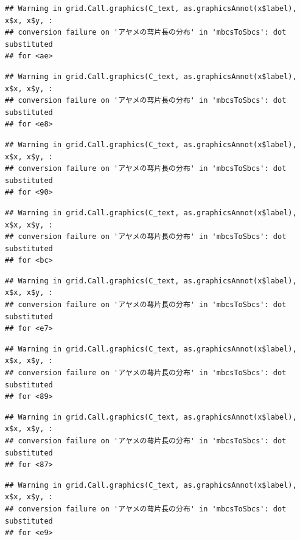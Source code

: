 \documentclass[
]{book}
\begin{document}
\begin{verbatim}
## Warning in grid.Call.graphics(C_text, as.graphicsAnnot(x$label), x$x, x$y, :
## conversion failure on 'アヤメの萼片長の分布' in 'mbcsToSbcs': dot substituted
## for <ae>
\end{verbatim}

\begin{verbatim}
## Warning in grid.Call.graphics(C_text, as.graphicsAnnot(x$label), x$x, x$y, :
## conversion failure on 'アヤメの萼片長の分布' in 'mbcsToSbcs': dot substituted
## for <e8>
\end{verbatim}

\begin{verbatim}
## Warning in grid.Call.graphics(C_text, as.graphicsAnnot(x$label), x$x, x$y, :
## conversion failure on 'アヤメの萼片長の分布' in 'mbcsToSbcs': dot substituted
## for <90>
\end{verbatim}

\begin{verbatim}
## Warning in grid.Call.graphics(C_text, as.graphicsAnnot(x$label), x$x, x$y, :
## conversion failure on 'アヤメの萼片長の分布' in 'mbcsToSbcs': dot substituted
## for <bc>
\end{verbatim}

\begin{verbatim}
## Warning in grid.Call.graphics(C_text, as.graphicsAnnot(x$label), x$x, x$y, :
## conversion failure on 'アヤメの萼片長の分布' in 'mbcsToSbcs': dot substituted
## for <e7>
\end{verbatim}

\begin{verbatim}
## Warning in grid.Call.graphics(C_text, as.graphicsAnnot(x$label), x$x, x$y, :
## conversion failure on 'アヤメの萼片長の分布' in 'mbcsToSbcs': dot substituted
## for <89>
\end{verbatim}

\begin{verbatim}
## Warning in grid.Call.graphics(C_text, as.graphicsAnnot(x$label), x$x, x$y, :
## conversion failure on 'アヤメの萼片長の分布' in 'mbcsToSbcs': dot substituted
## for <87>
\end{verbatim}

\begin{verbatim}
## Warning in grid.Call.graphics(C_text, as.graphicsAnnot(x$label), x$x, x$y, :
## conversion failure on 'アヤメの萼片長の分布' in 'mbcsToSbcs': dot substituted
## for <e9>
\end{verbatim}
\end{document}
